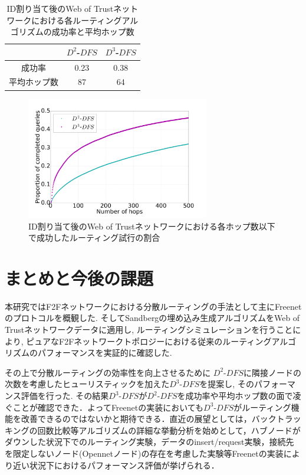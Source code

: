 \documentclass[technicalreport]{./ieicej-v3.0/UTF/ieicej}
\begin{document}
  \begin{table}[htb]
   \begin{center}  
    \begin{tabular}{|c|c|c|} \hline
    & $D^2$-$DFS$ & $D^3$-$DFS$ \\ \hline
    成功率 & 0.23 & 0.38\\ \hline
    平均ホップ数 & 87 & 64\\ \hline
    \end{tabular}
   \end{center}
   \caption{ID割り当て後のWeb of Trustネットワークにおける各ルーティングアルゴリズムの成功率と平均ホップ数}
   \label{table:succ_hops_full}
  \end{table}
  \begin{figure}[htb]
   \centerline{\includegraphics[width=80mm]{../fig/simple_cml_noclip.png}}
   \caption{ID割り当て後のWeb of Trustネットワークにおける各ホップ数以下で成功したルーティング試行の割合}
    \label{fig:simple_cml_noclip}
  \end{figure}

\section{まとめと今後の課題}
本研究ではF2Fネットワークにおける分散ルーティングの手法として主にFreenetのプロトコルを概観した. そしてSandbergの埋め込み生成アルゴリズムをWeb of Trustネットワークデータに適用し, ルーティングシミュレーションを行うことにより, ピュアなF2Fネットワークトポロジーにおける従来のルーティングアルゴリズムのパフォーマンスを実証的に確認した.

その上で分散ルーティングの効率性を向上させるために $D^2$-$DFS$に隣接ノードの次数を考慮したヒューリスティックを加えた$D^3$-$DFS$を提案し, そのパフォーマンス評価を行った. その結果$D^3$-$DFS$が$D^2$-$DFS$を成功率や平均ホップ数の面で凌ぐことが確認できた．よってFreenetの実装においても$D^3$-$DFS$がルーティング機能を改善できるのではないかと期待できる．直近の展望としては，バックトラッキングの回数比較等アルゴリズムの詳細な挙動分析を始めとして，ハブノードがダウンした状況下でのルーティング実験，データのinsert/request実験，接続先を限定しないノード(Opennetノード)の存在を考慮した実験等Freenetの実装により近い状況下におけるパフォーマンス評価が挙げられる．
\end{document}
